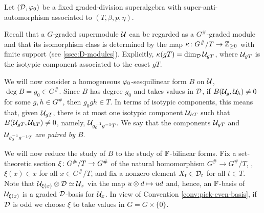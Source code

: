 Let $(\mathcal{D}, \varphi_0)$ be a fixed graded-division superalgebra with super-anti-automorphism associated to $(T, \beta, p, \eta)$.

Recall that a $G$-graded supermodule $\mathcal U$ can be regarded as a $G^\#$-graded module
and that its isomorphism class is determined by the map $\kappa\colon G^\#/T \to \mathbb{Z}_{\geq 0}$ with finite support (see \cref{ssec:D-modules}).
Explicitly, $\kappa (gT) = \dim_{\mathcal{D}} \mathcal U_{gT}$, where $\mathcal U_{gT}$ is the isotypic component associated to the coset $gT$.


We will now consider a
homogeneous $\varphi_0$-sesquilinear form $B$ on $\mathcal U$, $\deg B = g_0 \in G^\#$.
Since $B$ has degree $g_0$ and takes values in $\mathcal{D}$, if $B(\mathcal U_{g}, \mathcal U_{h}) \neq 0$ for some $g, h \in G^\#$, then $g_0 g h \in T$.
In terms of isotypic components, this means that, given $\mathcal U_{g T}$, there is at most one isotypic component $\mathcal U_{hT}$ such that $B(\mathcal U_{gT}, \mathcal U_{hT}) \neq 0$, namely, $\mathcal U_{g_0^{-1} g^{-1} T}$.
We say that the components $\mathcal U_{gT}$ and $\mathcal U_{g_0^{-1} g^{-1} T}$ are \emph{paired by $B$}.


We will now reduce the study of $B$ to the study of $\mathbb{F}$-bilinear forms.
Fix a set-theoretic section $\xi\colon G^\#/T \to G^\#$ of the natural homomorphism $ G^\# \to G^\#/T$, \ie, $\xi (x) \in x$ for all $x \in G^\#/T$, and fix a nonzero element $X_t \in \mathcal{D}_t$ for all $t\in T$.
Note that $\mathcal U_{\xi(x)} \otimes \mathcal{D} \simeq \mathcal U_x$ via the map $u \otimes d \mapsto ud$ and, hence, an $\mathbb{F}$-basis of $\mathcal U_{\xi(x)}$ is a graded $\mathcal{D}$-basis for $\mathcal U_x$.
In view of Convention \ref{conv:pick-even-basis}, if $\mathcal{D}$ is odd we choose $\xi$ to take values in $G = G\times \{ \bar 0 \}$.

